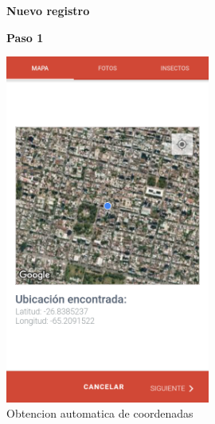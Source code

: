 				\begin{figure}[H]
					\hspace*{1cm}\raggedright\large\textbf{Nuevo registro}\par\medskip
					\centering
					\textbf{Paso 1}\par\medskip
					\includegraphics[width=0.6\textwidth]{Screenshots/registroPaso1.png}
					\caption{Obtencion automatica de coordenadas}
				\end{figure}
				
